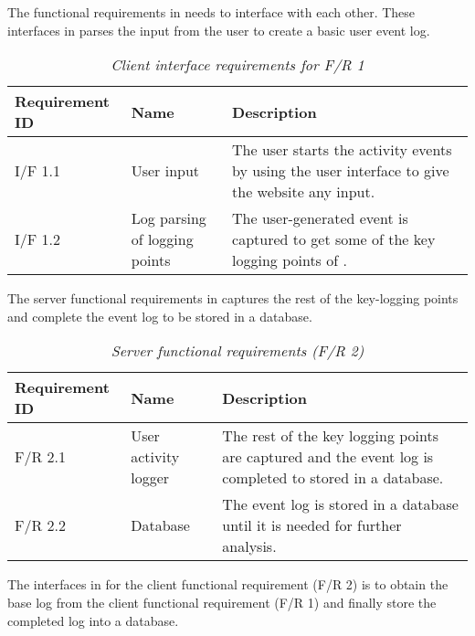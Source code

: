 \clearpage

The functional requirements in  needs to interface with each other. These interfaces in  parses the input from the user to create a basic user event log. 

\begin{table}[!htb]
	\centering
	\small
	\caption[Client interface requirements]
	{\textit{Client interface requirements for F/R 1}}
	\label{tbl:Ch2_Client_Interface_Requirements}
	\begin{tabularx}{\textwidth}{|l|l|X|}
		\hline \textbf{Requirement ID} & \textbf{Name} & \textbf{Description} \\
		\hline I/F 1.1 & User input & The user starts the activity events by using the user interface to give the website any input.\\
		\hline I/F 1.2 & Log parsing of logging points & The user-generated event is captured to get some of the key logging points of \Cref{tbl:CH1_Log_Basic_Attributes}.\\
		\hline
	\end{tabularx}
\end{table}

The server functional requirements in  captures the rest of the key-logging points and complete the event log to be stored in a database. 

\begin{table}[!htb]
	\centering
	\small
	\caption[Server functional requirements]
	{\textit{Server functional requirements (F/R 2)}}
	\label{tbl:Ch2_Server_Functional_Requirements}
	\begin{tabularx}{\textwidth}{|l|l|X|}
		\hline \textbf{Requirement ID} & \textbf{Name} & \textbf{Description} \\
		\hline F/R 2.1 & User activity logger & The rest of the key logging points are captured and the event log is completed to stored in a database.\\
		\hline F/R 2.2 & Database & The event log is stored in a database until it is needed for further analysis.\\
		\hline
	\end{tabularx}
\end{table}

The interfaces in  for the client functional requirement (F/R 2) is to obtain the base log from the client functional requirement (F/R 1) and finally store the completed log into a database.

